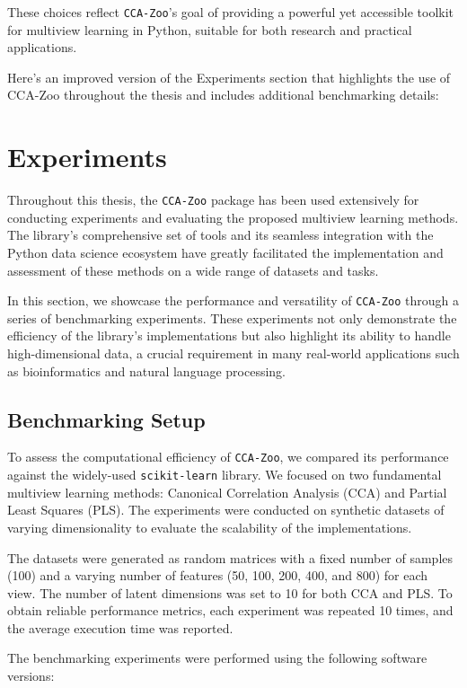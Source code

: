 These choices reflect \texttt{CCA-Zoo}'s goal of providing a powerful yet accessible toolkit for multiview learning in Python, suitable for both research and practical applications.

Here's an improved version of the Experiments section that highlights the use of CCA-Zoo throughout the thesis and includes additional benchmarking details:

\section{Experiments}\label{sec:experiments}

Throughout this thesis, the \texttt{CCA-Zoo} package has been used extensively for conducting experiments and evaluating the proposed multiview learning methods. The library's comprehensive set of tools and its seamless integration with the Python data science ecosystem have greatly facilitated the implementation and assessment of these methods on a wide range of datasets and tasks.

In this section, we showcase the performance and versatility of \texttt{CCA-Zoo} through a series of benchmarking experiments. These experiments not only demonstrate the efficiency of the library's implementations but also highlight its ability to handle high-dimensional data, a crucial requirement in many real-world applications such as bioinformatics and natural language processing.

\subsection{Benchmarking Setup}

To assess the computational efficiency of \texttt{CCA-Zoo}, we compared its performance against the widely-used \texttt{scikit-learn} library. We focused on two fundamental multiview learning methods: Canonical Correlation Analysis (CCA) and Partial Least Squares (PLS). The experiments were conducted on synthetic datasets of varying dimensionality to evaluate the scalability of the implementations.

The datasets were generated as random matrices with a fixed number of samples (100) and a varying number of features (50, 100, 200, 400, and 800) for each view. The number of latent dimensions was set to 10 for both CCA and PLS. To obtain reliable performance metrics, each experiment was repeated 10 times, and the average execution time was reported.

The benchmarking experiments were performed using the following software versions:

